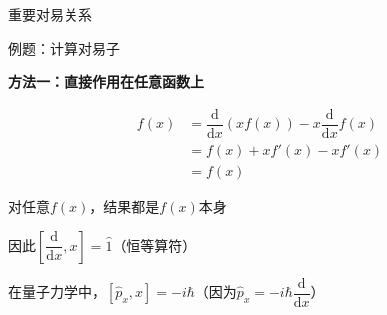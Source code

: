 \begin{frame}{重要对易关系}
  
\end{frame}

\begin{frame}{例题：计算对易子}

  \textbf{方法一：直接作用在任意函数上}

  \begin{align*}
    [\dfrac{\mathrm{d}}{\mathrm{d}x}, x]f(x) &= \dfrac{\mathrm{d}}{\mathrm{d}x}(xf(x)) - x\dfrac{\mathrm{d}}{\mathrm{d}x}f(x) \\
                         &= f(x) + xf'(x) - xf'(x) \\
                         &= f(x)
  \end{align*}

  \begin{iqbitemize}
    \item 对任意$f(x)$，结果都是$f(x)$本身
    \item 因此$[\dfrac{\mathrm{d}}{\mathrm{d}x}, x] = \hat{1}$（恒等算符）
  \end{iqbitemize}

  \iqbsep

  在量子力学中，$[\hat{p}_x, x] = -i\hbar$（因为$\hat{p}_x = -i\hbar\dfrac{\mathrm{d}}{\mathrm{d}x}$）
\end{frame}
